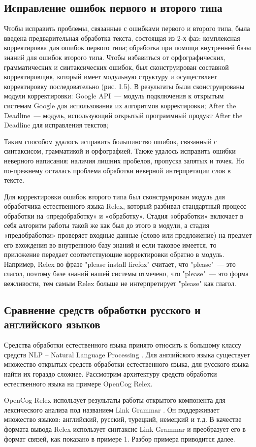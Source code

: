  
\clearpage
\subsection{Исправление ошибок первого и второго типа} \label{sect2_2}
Чтобы исправить проблемы, связанные с ошибками первого и второго типа, была введена предварительная обработка текста, состоящая из 2-х фаз: комплексная корректировка для ошибок первого типа; обработка при помощи внутренней базы знаний для ошибок второго типа. 
Чтобы избавиться от орфографических, грамматических и синтаксических ошибок, был сконструирован составной корректировщик, который имеет модульную структуру и осуществляет корректировку последовательно (рис. 1.5). В результаты были сконструированы модули корректировки: Google API~--- модуль подключения к открытым системам Google для использования их алгоритмов корректировки; After the Deadline~--- модуль, использующий открытый программный продукт After the Deadline для исправления текстов; 

Таким способом удалось исправить большинство ошибок, связанный с синтаксисом, грамматикой и орфографией. Также удалось исправить ошибки неверного написания: наличия лишних пробелов, пропуска запятых и точек. Но по-прежнему осталась проблема обработки неверной интерпретации слов в тексте. \par

Для корректировки ошибок второго типа был сконструирован модуль для обработчика естественного языка Relex, который разбивал стандартный процесс обработки на «предобработку» и «обработку». Стадия «обработки» включает в себя алгоритм работы такой же как был до этого в модули, а стадия «предобработки» проверяет входные данные (слово или предложение) на предмет его вхождения во внутреннюю базу знаний и если таковое имеется, то приложение передает соответствующие корректировки обратно в модуль. Например, Relex во фразе "please install firefox" считает, что "please"~--- это глагол, поэтому базе знаний нашей системы отмечено, что "please"~--- это форма вежливости, тем самым Relex больше не интерпретирует "please" как глагол.

\clearpage
\subsection{Сравнение средств обработки русского и английского языков} \label{sect2_3}
Средства обработки естественного языка принято относить к большому классу средств NLP – Natural Language Processing \cite{NLP}. Для английского языка существует множество открытых средств обработки естественного языка, для русского языка найти их гораздо сложнее. Рассмотрим архитектуру средств обработки естественного языка на примере OpenCog Relex. \par
OpenCog Relex использует результаты работы открытого компонента для лексического анализа под названием Link Grammar \cite{linkgrammar}. Он поддерживает множество языков: английский, русский, турецкий, немецкий и т.д.  В качестве формата вывода Relex использует синтаксис Link Grammar и преобразует его в формат связей, как показано в примере 1. Разбор примера приводится далее. 

